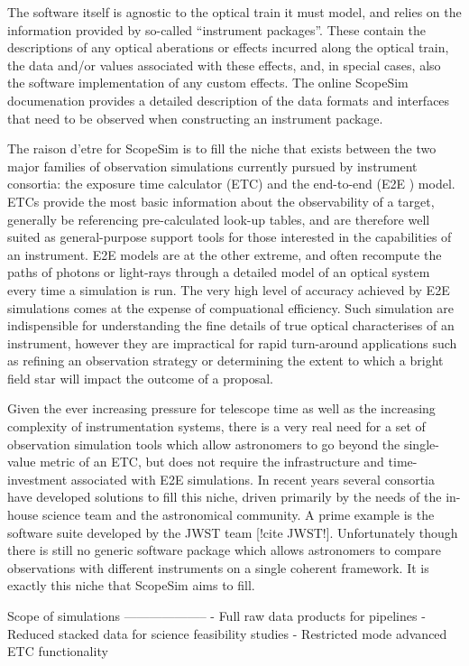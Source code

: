 The software itself is agnostic to the optical train it must model, and
relies on the information provided by so-called ``instrument packages''.
These contain the descriptions of any optical aberations or effects incurred
along the optical train, the data and/or values associated with these
effects, and, in special cases, also the software implementation of any
custom effects. The online ScopeSim documenation provides a detailed
description of the data formats and interfaces that need to be observed when
constructing an instrument package.

The raison d'etre for ScopeSim is to fill the niche that exists between the
two major families of observation simulations currently pursued by instrument
consortia: the exposure time calculator (ETC) and the end-to-end (E2E ) model.
ETCs provide the most basic information about the observability of a target,
generally be referencing pre-calculated look-up tables, and are therefore
well suited as general-purpose support tools for those interested in the
capabilities of an instrument. E2E models are at the other extreme, and
often recompute the paths of photons or light-rays through a detailed model
of an optical system every time a simulation is run. The very high level of
accuracy achieved by E2E simulations comes at the expense of compuational
efficiency. Such simulation are indispensible for understanding the fine
details of true optical characterises of an instrument, however they are
impractical for rapid turn-around applications such as refining an
observation strategy or determining the extent to which a bright field star
will impact the outcome of a proposal.

Given the ever increasing pressure for telescope time as well as the
increasing complexity of instrumentation systems, there is a very real need
for a set of observation simulation tools which allow astronomers to go
beyond the single-value metric of an ETC, but does not require the
infrastructure and time-investment associated with E2E simulations. In recent
years several consortia have developed solutions to fill this niche, driven
primarily by the needs of the in-house science team and the astronomical
community. A prime example is the software suite developed by the JWST team
[!cite JWST!]. Unfortunately though there is still no generic software
package which allows astronomers to compare observations with different
instruments on a single coherent framework. It is exactly this niche that
ScopeSim aims to fill.


Scope of simulations
--------------------
- Full raw data products for pipelines
- Reduced stacked data for science feasibility studies
- Restricted mode advanced ETC functionality


